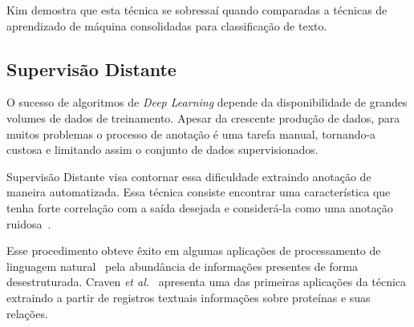 Kim demostra que esta técnica se sobressaí quando comparadas a técnicas de aprendizado de máquina consolidadas para
classificação de texto.

\subsection{Supervisão Distante}\label{distant_supervision}

O sucesso de algoritmos de \textit{Deep Learning} depende da disponibilidade de grandes volumes de dados de treinamento.
Apesar da crescente produção de dados, para muitos problemas o processo de anotação é uma tarefa manual, tornando-a
custosa e limitando assim o conjunto de dados supervisionados.

Supervisão Distante visa contornar essa dificuldade extraindo anotação de maneira automatizada.
Essa técnica consiste encontrar uma característica que tenha forte correlação com a saída desejada e considerá-la como
uma anotação ruidosa~\cite{go09}.

Esse procedimento obteve êxito em algumas aplicações de processamento de linguagem natural~\cite{craven99}\cite{go09}
pela abundância de informações presentes de forma desestruturada.
Craven \textit{et al.}~\cite{craven99} apresenta uma das primeiras aplicações da técnica extraindo a partir de registros
textuais informações sobre proteínas e suas relações.
